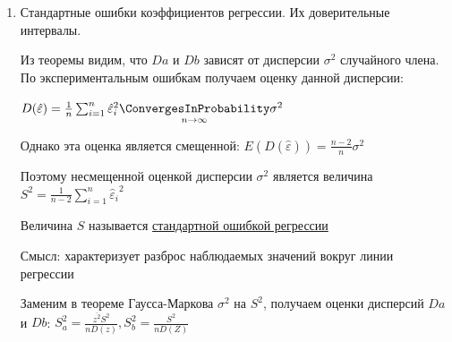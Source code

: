 \documentclass[12pt]{article}
\begin{document}
\begin{enumerate}
\begin{MyTheorem}
        Если выполнено условия:

        \begin{enumerate}[label=\asbuk*),ref=\asbuk*]
            \item Случайные члены $\varepsilon_i$ независимые случайные величины, имеющие одинаковое нормальное распределение $\varepsilon_i \in N(0, \sigma^2)$
            \item Случайные величины $\varepsilon_i$ и $Z_i$ - независимы
        \end{enumerate}

        Тогда $a$ и $b$ - состоятельные, несмещенные, эффективные оценки параметров $\alpha$ и $\beta$, то есть

        \begin{enumerate}
            \item Состоятельность: $a \underset{n \to \infty}{\ConvergesInProbability} \alpha, b \underset{n \to \infty}{\ConvergesInProbability} \beta$
            \item Несмещенность: $Ea = \alpha, Eb = \beta$
            \item Наименьшая дисперсия, равная:

            $D a = \frac{\overline{z^2} \sigma^2}{n D(Z)}, Db = \frac{\sigma^2}{n D(Z)}$
        \end{enumerate}
    \end{MyTheorem}


    \item Стандартные ошибки коэффициентов регрессии. Их доверительные интервалы.

    Из теоремы видим, что $Da$ и $Db$ зависят от дисперсии $\sigma^2$ случайного члена. 
    По экспериментальным ошибкам получаем оценку данной дисперсии:

    $D(\hat \varepsilon) = \frac{1}{n} \sum_{i = 1}^n {\hat \varepsilon_i}^2 \underset{n \to \infty}{\ConvergesInProbability} \sigma^2$

    Однако эта оценка является смещенной: $E(D(\hat \varepsilon)) = \frac{n - 2}{n} \sigma^2$

    Поэтому несмещенной оценкой дисперсии $\sigma^2$ является величина $S^2 = \frac{1}{n - 2} \sum_{i = 1}^n {\hat \varepsilon_i}^2$

    \Def Величина $S$ называется \hyperlink{regression_coefficient_error}{стандартной ошибкой регрессии}

    Смысл: характеризует разброс наблюдаемых значений вокруг линии регрессии

    \Notas Заменим в теореме Гаусса-Маркова $\sigma^2$ на $S^2$, получаем оценки дисперсий $Da$ и $Db$: $S_a^2 = \frac{\overline{z^2} S^2}{n D(z)}, S^2_b = \frac{S^2}{n D(Z)}$


\end{enumerate}
\end{document}
